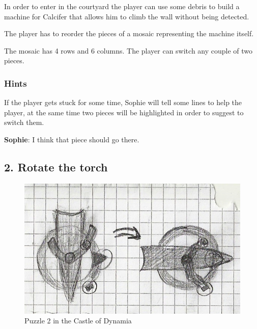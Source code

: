 In order to enter in the courtyard the player can use some debris to build a machine for Calcifer that allows him to climb the wall without being detected.


The player has to reorder the pieces of a mosaic representing the machine itself.

The mosaic has 4 rows and 6 columns. The player can switch any couple of two pieces.

\subsubsection*{Hints}
If the player gets stuck for some time, Sophie will tell some lines to help the player, at the same time two pieces will be highlighted in order to suggest to switch them.

\textbf{Sophie}: I think that piece should go there.

\subsection{2. Rotate the torch}

\begin{figure}[H]
  \centering
  \includegraphics[width=\textwidth]{Images/Puzzles/castleOfDynamia_2}
  \caption{Puzzle 2 in the Castle of Dynamia}
\end{figure}



